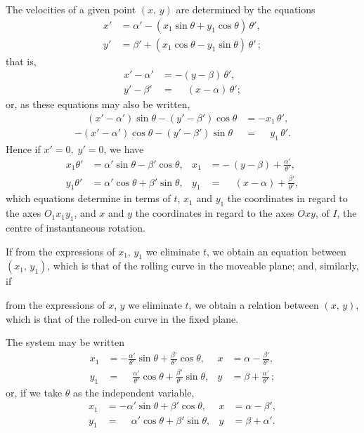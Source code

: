\documentclass[11pt]{article}
\begin{document}
The velocities of a given point $(x,\,y)$ are determined by the equations
\begin{align*}
x' &= \alpha' - (x_1 \sin\theta + y_1 \cos\theta)\,\theta',\\
y' &= \beta'  + (x_1 \cos\theta - y_1 \sin\theta)\,\theta'\,;
\end{align*}
that is,
\begin{align*}
x' - \alpha' &= -(y-\beta)\,\theta',\\
y' - \beta'  &= \phantom{-}(x-\alpha)\,\theta';
\end{align*}
or, as these equations may also be written,
\begin{align*}
\phantom{-}(x'-\alpha')\sin\theta - (y'-\beta')\cos\theta &= -x_1\,\theta',\\
-(x'-\alpha')\cos\theta - (y'-\beta')\sin\theta &= \phantom{-}y_1\,\theta'.
\end{align*}
Hence if $x' = 0,\; y' = 0$, we have
\begin{align*}
x_1 \theta' &= \alpha'\sin\theta - \beta'\cos\theta, & x_1 &= -\,(y-\beta) + \frac{\alpha'}{\theta'},\\
y_1 \theta' &= \alpha'\cos\theta + \beta'\sin\theta, & y_1 &= \phantom{-}(x-\alpha) + \frac{\beta'}{\theta'},
\end{align*}
which equations determine in terms of $t$, $x_1$ and $y_1$ the coordinates in regard to the
axes $O_1 x_1 y_1$, and $x$ and $y$ the coordinates in regard to the axes $Oxy$, of $I$, the centre
of instantaneous rotation.

If from the expressions of $x_1$, $y_1$ we eliminate $t$, we obtain an equation between
$(x_1,\,y_1)$, which is that of the rolling curve in the moveable plane; and, similarly, if


\bigskip

from the expressions of $x$, $y$ we eliminate $t$, we obtain a relation between $(x,\,y)$,
which is that of the rolled-on curve in the fixed plane.

The system may be written
\begin{align*}
x_1 &= -\frac{\alpha'}{\theta'}\sin\theta + \frac{\beta'}{\theta'}\cos\theta, & x &= \alpha - \frac{\beta'}{\theta'},\\
y_1 &= \phantom{-}\frac{\alpha'}{\theta'}\cos\theta + \frac{\beta'}{\theta'}\sin\theta, & y &= \beta + \frac{\alpha'}{\theta'}\,;
\end{align*}
or, if we take $\theta$ as the independent variable,
\begin{align*}
x_1 &= -\alpha'\sin\theta + \beta'\cos\theta, & x &= \alpha - \beta',\\
y_1 &= \phantom{-}\alpha'\cos\theta + \beta'\sin\theta, & y &= \beta + \alpha'.
\end{align*}
\end{document}
